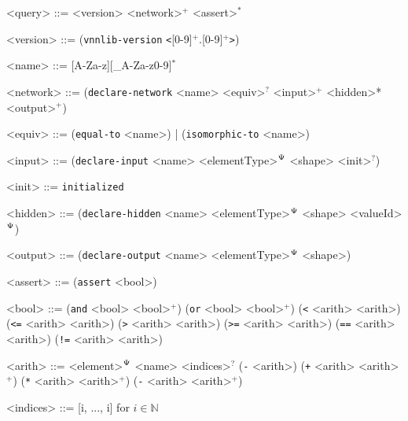 \begin{grammar}
	<query> ::= <version> <network>$^+$ <assert>$^*$
	
	<version> ::= (\texttt{vnnlib-version} \texttt{\textless}[0-9]$^+$.[0-9]$^+$\texttt{\textgreater})
	
	<name> ::= [A-Za-z][\_A-Za-z0-9]$^*$
		
	<network> ::= (\texttt{declare-network} <name> <equiv>$^?$ <input>$^+$ <hidden>* <output>$^+$)
	
	<equiv> ::= (\texttt{equal-to} <name>) | (\texttt{isomorphic-to} <name>)
	
	<input> ::= (\texttt{declare-input} <name> <elementType>$^\Psi$ <shape> <init>$^?$)

	<init> ::= \texttt{initialized}
	
	<hidden> ::= (\texttt{declare-hidden} <name> <elementType>$^\Psi$ <shape> <valueId>$^\Psi$)
	
	<output> ::= (\texttt{declare-output} <name> <elementType>$^\Psi$ <shape>)
	
	<assert> ::= (\texttt{assert} <bool>)
	
	<bool> ::= (\texttt{and} <bool> <bool>$^+$)
	\alt (\texttt{or} <bool> <bool>$^+$)
	\alt (\texttt{\textless} <arith> <arith>)
	\alt (\texttt{\textless=} <arith> <arith>)
	\alt (\texttt{\textgreater} <arith> <arith>)
	\alt (\texttt{\textgreater=} <arith> <arith>)
	\alt (\texttt{==} <arith> <arith>)
	\alt (\texttt{!=} <arith> <arith>)
	
	<arith> ::= <element>$^\Psi$
	\alt <name> <indices>$^?$
	\alt (\texttt{-} <arith>)
	\alt (\texttt{+} <arith> <arith>$^+$)
	\alt (\texttt{*} <arith> <arith>$^+$)
	\alt (\texttt{-} <arith> <arith>$^+$)
	
	<indices> ::= [i, ..., i] for $i \in \mathbb{N}$
\end{grammar}